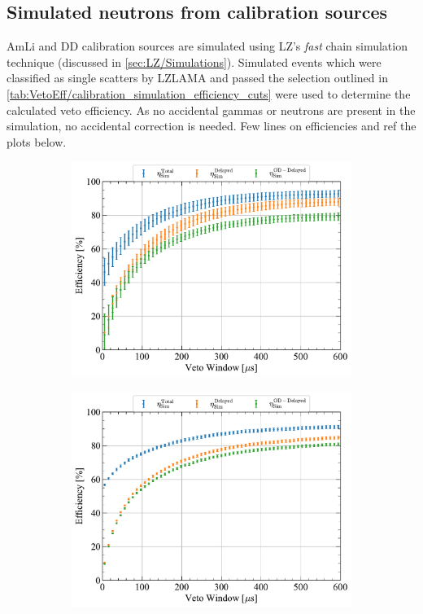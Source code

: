 \subsection{Simulated neutrons from calibration sources}
AmLi and DD calibration sources are simulated using LZ's \textit{fast} chain simulation technique (discussed in \autoref{sec:LZ/Simulations}). Simulated events which were classified as single scatters by LZLAMA and passed the selection outlined in \autoref{tab:VetoEff/calibration_simulation_efficiency_cuts} were used to determine the calculated veto efficiency.
As no accidental gammas or neutrons are present in the simulation, no accidental correction is needed.
{\color{red}Few lines on efficiencies and ref the plots below.}
\begin{figure}[!ht]
    \centering
    \begin{subfigure}[b]{0.49\textwidth}
        \centering
        \includegraphics[width=\textwidth]{figures/VetoEfficiency/AmLiEfficiencies_Sim.pdf}
        \caption{}
        \label{fig:VetoEff/AmLiSimEfficiencies}
    \end{subfigure}
    \hfill
    \begin{subfigure}[b]{0.49\textwidth}
        \centering
        \includegraphics[width=\textwidth]{figures/VetoEfficiency/DDEfficiencies_Sim.pdf}

\end{subfigure}
\end{figure}
